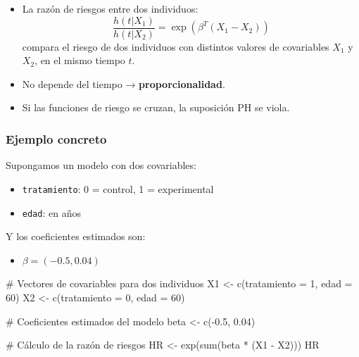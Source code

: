 \documentclass[
]{article}
\newenvironment{Shaded}{\begin{snugshade}}{\end{snugshade}}
\newcommand{\AttributeTok}[1]{\textcolor[rgb]{0.40,0.45,0.13}{#1}}
\newcommand{\CommentTok}[1]{\textcolor[rgb]{0.37,0.37,0.37}{#1}}
\newcommand{\DecValTok}[1]{\textcolor[rgb]{0.68,0.00,0.00}{#1}}
\newcommand{\FloatTok}[1]{\textcolor[rgb]{0.68,0.00,0.00}{#1}}
\newcommand{\FunctionTok}[1]{\textcolor[rgb]{0.28,0.35,0.67}{#1}}
\newcommand{\NormalTok}[1]{\textcolor[rgb]{0.00,0.23,0.31}{#1}}
\newcommand{\OtherTok}[1]{\textcolor[rgb]{0.00,0.23,0.31}{#1}}
\newcommand{\SpecialCharTok}[1]{\textcolor[rgb]{0.37,0.37,0.37}{#1}}
\providecommand{\tightlist}{%
  \setlength{\itemsep}{0pt}\setlength{\parskip}{0pt}}\usepackage{longtable,booktabs,array}
\begin{document}
\begin{itemize}
\item
  La razón de riesgos entre dos individuos: \[
  \frac{h(t|X_1)}{h(t|X_2)} = \exp(\beta^T(X_1 - X_2))
  \] compara el riesgo de dos individuos con distintos valores de
  covariables \(X_1\) y \(X_2\), en el mismo tiempo \(t\).
\item
  No depende del tiempo → \textbf{proporcionalidad}.
\item
  Si las funciones de riesgo se cruzan, la suposición PH se viola.
\end{itemize}

\subsubsection{Ejemplo concreto}\label{ejemplo-concreto}

Supongamos un modelo con dos covariables:

\begin{itemize}
\tightlist
\item
  \texttt{tratamiento}: 0 = control, 1 = experimental
\item
  \texttt{edad}: en años
\end{itemize}

Y los coeficientes estimados son:

\begin{itemize}
\tightlist
\item
  \(\beta = (-0.5, 0.04)\)
\end{itemize}

\begin{Shaded}
\begin{Highlighting}[]
\CommentTok{\# Vectores de covariables para dos individuos}
\NormalTok{X1 }\OtherTok{\textless{}{-}} \FunctionTok{c}\NormalTok{(}\AttributeTok{tratamiento =} \DecValTok{1}\NormalTok{, }\AttributeTok{edad =} \DecValTok{60}\NormalTok{)}
\NormalTok{X2 }\OtherTok{\textless{}{-}} \FunctionTok{c}\NormalTok{(}\AttributeTok{tratamiento =} \DecValTok{0}\NormalTok{, }\AttributeTok{edad =} \DecValTok{60}\NormalTok{)}

\CommentTok{\# Coeficientes estimados del modelo}
\NormalTok{beta }\OtherTok{\textless{}{-}} \FunctionTok{c}\NormalTok{(}\SpecialCharTok{{-}}\FloatTok{0.5}\NormalTok{, }\FloatTok{0.04}\NormalTok{)}

\CommentTok{\# Cálculo de la razón de riesgos}
\NormalTok{HR }\OtherTok{\textless{}{-}} \FunctionTok{exp}\NormalTok{(}\FunctionTok{sum}\NormalTok{(beta }\SpecialCharTok{*}\NormalTok{ (X1 }\SpecialCharTok{{-}}\NormalTok{ X2)))}
\NormalTok{HR}
\end{Highlighting}
\end{Shaded}
\end{document}
